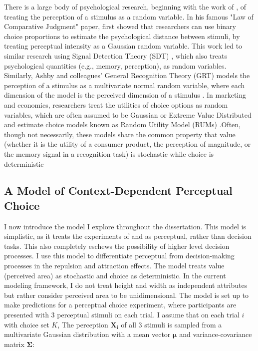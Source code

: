 There is a large body of psychological research, beginning with the work of \textcite{thurstone1927law}, of treating the perception of a stimulus as a random variable. In his famous "Law of Comparative Judgment" paper, \textcite{thurstone1927law} first showed that researchers can use binary choice proportions to estimate the psychological distance between stimuli, by treating perceptual intensity as a Gaussian random variable. This work led to similar research using Signal Detection Theory (SDT) \parencite{hautus2021detection}, which also treats psychological quantities (e.g., memory, perception), as random variables. Similarly, Ashby and colleagues' General Recognition Theory (GRT) models the perception of a stimulus as a multivariate normal random variable, where each dimension of the model is the perceived dimension of a stimulus \parencite{ashbyVarietiesPerceptualIndependence1986a,ashby1988decision, ashbyUnifiedTheorySimilarity}. In marketing and economics, researchers treat the utilities of choice options as random variables, which are often assumed to be Gaussian or Extreme Value Distributed and estimate choice models known as Random Utility Model (RUMs) \parencite{mcfadden2001economic,hausman1978conditional,train2009discrete}.Often, though not necessarily, these models share the common property that value (whether it is the utility of a consumer product, the perception of magnitude, or the memory signal in a recognition task) is stochastic while choice is deterministic  \parencite[~c.f.]{benjamin2009signal} 

\subsection{A Model of Context-Dependent Perceptual Choice}

I now introduce the model I explore throughout the dissertation.  This model is simplistic, as it treats the experiments of \textcite{trueblood2013not} and \textcite{spektorWhenGoodLooks2018b} as perceptual, rather than decision tasks. This also completely eschews the possibility of higher level decision processes. I use this model to differentiate perceptual from decision-making processes in the repulsion and attraction effects. The model treats value (perceived area) as stochastic and choice as deterministic. In the current modeling framework, I do not treat height and width as independent attributes but rather consider perceived area to be unidimensional. The model is set up to make predictions for a perceptual choice experiment, where participants are presented with 3 perceptual stimuli on each trial. I assume that on each trial $i$ with choice set $K$, The perception $\mathbf{X_i}$ of all 3 stimuli is sampled from a multivariate Gaussian distribution with a mean vector $\boldsymbol{\mu}$ and variance-covariance matrix $\boldsymbol{\Sigma}$:

